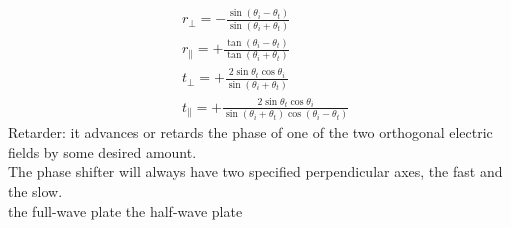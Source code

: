 \documentclass[fleqn,leqno]{article}
\begin{document}
	\begin{equation*}
		\begin{split}
			&r_{\bot}=-\frac{\sin(\theta_{i}-\theta_{t})}{\sin(\theta_{i}+\theta_{t})}\\
			&r_{\parallel}=+\frac{\tan(\theta_{i}-\theta_{t})}{\tan(\theta_{i}+\theta_{t})}\\
			&t_{\bot}=+\frac{2\sin\theta_{t}\cos\theta_{i}}{\sin(\theta_{i}+\theta_{t})}\\
			&t_{\parallel}=+\frac{2\sin\theta_{t}\cos\theta_{i}}{\sin(\theta_{i}+\theta_{t})\cos(\theta_{i}-\theta_{t})}
		\end{split}
	\end{equation*}
	Retarder: it advances or retards the phase of one of the two orthogonal electric fields by some desired amount.\\
	The phase shifter will always have two specified perpendicular axes, the fast and the slow.\\
	the full-wave plate    the half-wave plate
\end{document}
